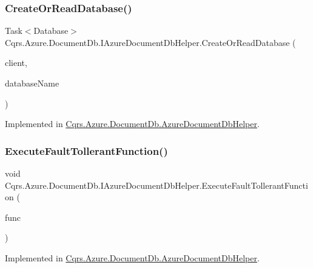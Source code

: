 \subsubsection{\texorpdfstring{Create\+Or\+Read\+Database()}{CreateOrReadDatabase()}}
{\footnotesize\ttfamily Task$<$Database$>$ Cqrs.\+Azure.\+Document\+Db.\+I\+Azure\+Document\+Db\+Helper.\+Create\+Or\+Read\+Database (\begin{DoxyParamCaption}\item[{Document\+Client}]{client,  }\item[{string}]{database\+Name }\end{DoxyParamCaption})}



Implemented in \hyperlink{classCqrs_1_1Azure_1_1DocumentDb_1_1AzureDocumentDbHelper_ad16ab0ecb4524057ddb2f8e67043179f_ad16ab0ecb4524057ddb2f8e67043179f}{Cqrs.\+Azure.\+Document\+Db.\+Azure\+Document\+Db\+Helper}.

\mbox{\label{interfaceCqrs_1_1Azure_1_1DocumentDb_1_1IAzureDocumentDbHelper_af0a2c96f00154420faa7c528d5bf55bb_af0a2c96f00154420faa7c528d5bf55bb}} 
\subsubsection{\texorpdfstring{Execute\+Fault\+Tollerant\+Function()}{ExecuteFaultTollerantFunction()}}
{\footnotesize\ttfamily void Cqrs.\+Azure.\+Document\+Db.\+I\+Azure\+Document\+Db\+Helper.\+Execute\+Fault\+Tollerant\+Function (\begin{DoxyParamCaption}\item[{Action}]{func }\end{DoxyParamCaption})}



Implemented in \hyperlink{classCqrs_1_1Azure_1_1DocumentDb_1_1AzureDocumentDbHelper_a334337444ff416c9f4ce48ec61e60a83_a334337444ff416c9f4ce48ec61e60a83}{Cqrs.\+Azure.\+Document\+Db.\+Azure\+Document\+Db\+Helper}.

